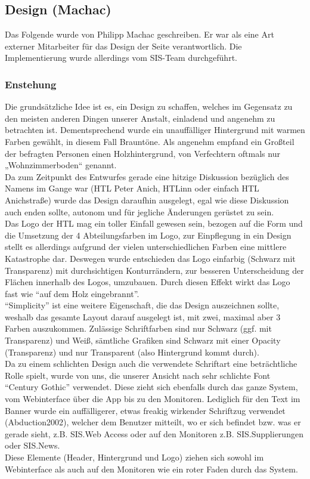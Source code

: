 \subsection{Design (Machac)}
\label{sec:content_design}
Das Folgende wurde von Philipp Machac geschreiben. Er war als eine Art externer Mitarbeiter für das Design der Seite verantwortlich. Die Implementierung wurde allerdings vom SIS-Team durchgeführt.
\subsubsection{Enstehung}
Die grundsätzliche Idee ist es, ein Design zu schaffen, welches im Gegensatz zu den meisten anderen Dingen unserer Anstalt, einladend und angenehm zu betrachten ist. Dementsprechend wurde ein unauffälliger Hintergrund mit warmen Farben gewählt, in diesem Fall Brauntöne. Als angenehm empfand ein Großteil der befragten Personen einen Holzhintergrund, von Verfechtern oftmals nur „Wohnzimmerboden“ genannt.\\
Da zum Zeitpunkt des Entwurfes gerade eine hitzige Diskussion bezüglich des Namens im Gange war (HTL Peter Anich, HTLinn oder einfach HTL Anichstraße) wurde das Design daraufhin ausgelegt, egal wie diese Diskussion auch enden sollte, autonom und für jegliche Änderungen gerüstet zu sein.\\
Das Logo der HTL mag ein toller Einfall gewesen sein, bezogen auf die Form und die Umsetzung der 4 Abteilungsfarben im Logo, zur Einpflegung in ein Design stellt es allerdings aufgrund der vielen unterschiedlichen Farben eine mittlere Katastrophe dar. Deswegen wurde entschieden das Logo einfarbig (Schwarz mit Transparenz) mit durchsichtigen Konturrändern, zur besseren Unterscheidung der Flächen innerhalb des Logos, umzubauen. Durch diesen Effekt wirkt das Logo fast wie \enquote{auf dem Holz eingebrannt}.\\
\enquote{Simplicity} ist eine weitere Eigenschaft, die das Design auszeichnen sollte, weshalb das gesamte Layout darauf ausgelegt ist, mit zwei, maximal aber 3 Farben auszukommen. Zulässige Schriftfarben sind nur Schwarz (ggf. mit Transparenz) und Weiß, sämtliche Grafiken sind Schwarz mit einer Opacity (Transparenz) und nur Transparent (also Hintergrund kommt durch).\\
Da zu  einem schlichten Design auch die verwendete Schriftart eine beträchtliche Rolle spielt, wurde von uns, die unserer Ansicht nach sehr schlichte Font \enquote{Century Gothic} verwendet. Diese zieht sich ebenfalls durch das ganze System, vom Webinterface über die App bis zu den Monitoren. Lediglich für den Text im Banner wurde ein auffälligerer, etwas freakig wirkender Schriftzug verwendet (Abduction2002), welcher dem Benutzer mitteilt, wo er sich befindet bzw. was er gerade sieht, z.B. SIS.Web Access oder auf den Monitoren z.B. SIS.Supplierungen oder SIS.News.\\
Diese Elemente (Header, Hintergrund und Logo) ziehen sich sowohl im Webinterface als auch auf den Monitoren wie ein roter Faden durch das System.\\
